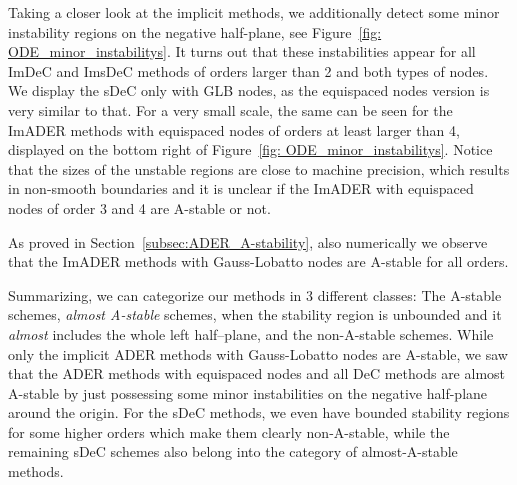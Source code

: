 Taking a closer look at the implicit methods, we additionally detect some minor instability regions on the negative half-plane, see Figure~\ref{fig: ODE_minor_instabilitys}.
It turns out that these instabilities appear for all ImDeC and ImsDeC methods of orders larger than 2 and both types of nodes. We display the sDeC only with GLB nodes, as the equispaced nodes version is very similar to that.
For a very small scale, the same can be seen for the ImADER methods with equispaced nodes of orders at least larger than 4, displayed on the bottom right of Figure~\ref{fig: ODE_minor_instabilitys}. 
Notice that the sizes of the unstable regions are close to machine precision, which results in non-smooth boundaries and it is unclear if the ImADER with equispaced nodes of order 3 and 4 
are A-stable or not. 

As proved in Section~\ref{subsec:ADER_A-stability}, also numerically we observe that the ImADER methods with Gauss-Lobatto nodes are A-stable for all orders. 



Summarizing, we can categorize our methods in 3 different classes: The A-stable schemes, \textit{almost A-stable} schemes, when the stability region is unbounded and it \textit{almost} includes the whole left half--plane, and the non-A-stable schemes. 
While only the implicit ADER methods with Gauss-Lobatto nodes are A-stable, we saw that the ADER methods with equispaced nodes and all DeC methods are almost A-stable by just possessing some minor instabilities on the negative half-plane around the origin. 
For the sDeC methods, we even have bounded stability regions for some higher orders which make them clearly non-A-stable, while the remaining sDeC schemes also belong into the category of almost-A-stable methods. 

